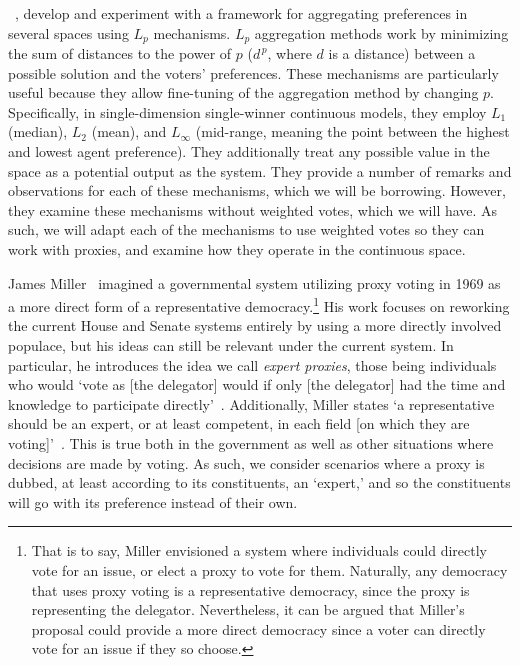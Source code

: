 ~\cite{Bulteau2021}, develop and experiment with a framework for
aggregating preferences in several spaces using $L_p$ mechanisms.
$L_p$ aggregation methods work by minimizing the sum of distances to the power of $p$
($d^{\,p}$, where $d$ is a distance) between a possible solution and the voters'
preferences.
These mechanisms are particularly useful because they allow fine-tuning of the
aggregation method by changing $p$.
Specifically, in single-dimension single-winner continuous models, they employ $L_1$
(median),
$L_2$ (mean), and $L_{\infty}$ (mid-range, meaning the point between the highest and
lowest agent preference).
They additionally treat any possible value in the space as a potential output as the
system.
They provide a number of remarks and observations for each of these mechanisms, which
we will be borrowing.
However, they examine these mechanisms without weighted votes, which we will have.
As such, we will adapt each of the mechanisms to use weighted votes so they can work
with proxies, and examine how they operate in the continuous space.

James Miller~\cite{Miller1969} imagined a governmental system utilizing proxy voting
in 1969 as a more direct form of a representative democracy.\footnote{
    That is to say, Miller envisioned a system where individuals could directly vote
    for an issue, or elect a proxy to vote for them.
    Naturally, any democracy that uses proxy voting is a representative democracy,
    since the proxy is representing the delegator.
    Nevertheless, it can be argued that Miller's proposal could provide a more direct
    democracy since a voter can directly vote for an issue if they so choose.
}
His work focuses on reworking the current House and Senate systems entirely by using a
more directly involved populace, but his ideas can still be relevant under the current
system.
In particular, he introduces the idea we call \textit{expert proxies},
those being individuals who would `vote as [the delegator] would if only
[the delegator] had the time and knowledge to participate directly'~\cite{Miller1969}.
Additionally, Miller states `a representative should be an expert, or at least
competent, in each field [on which they are voting]'~\cite{Miller1969}.
This is true both in the government as well as other situations where decisions are
made by voting.
As such, we consider scenarios where a proxy is dubbed, at least according to its
constituents, an `expert,' and so the constituents will go with its preference
instead of their own.
